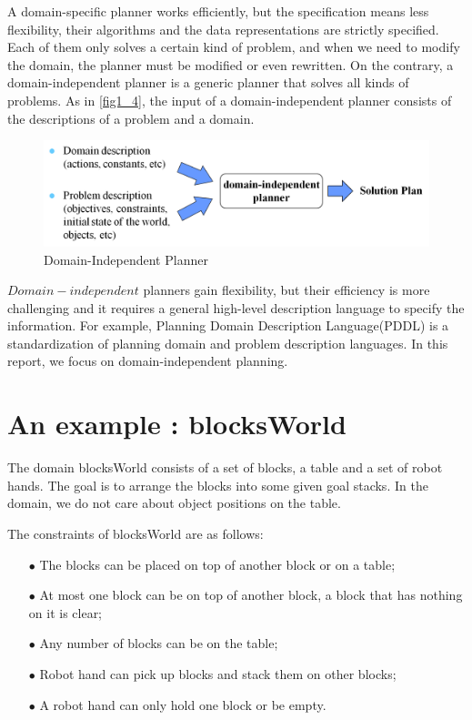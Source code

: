 A domain-specific planner works efficiently, but the specification means less flexibility, their algorithms and the data representations are strictly specified. Each of them only solves a certain kind of problem, and when we need to modify the domain, the planner must be modified or even rewritten. On the contrary, a domain-independent planner is a generic planner that solves all kinds of problems. As in \autoref{fig1_4}, the input of a domain-independent planner consists of the descriptions of a problem and a domain.

\begin{figure}[H]
    \center
    \includegraphics[width=\textwidth]{./images/1_4.png}
    \caption{Domain-Independent Planner}
    \label{fig1_4}
\end{figure}

$Domain-independent$ planners gain flexibility, but their efficiency is more challenging and it requires a general high-level description language to specify the information. For example, Planning Domain Description Language(PDDL) is a standardization of planning domain and problem description languages. In this report, we focus on domain-independent planning.

\section{An example : blocksWorld}
The domain blocksWorld consists of a set of blocks, a table and a set of robot hands. The goal is to arrange the blocks into some given goal stacks. In the domain, we do not care about object positions on the table.

The constraints of blocksWorld are as follows:
\begin{itemize}\itemsep0pt \parskip0pt 
\item[$\bullet$] The blocks can be placed on top of another block or on a table;
\item[$\bullet$] At most one block can be on top of another block, a block that has nothing on it is clear;
\item[$\bullet$] Any number of blocks can be on the table;
\item[$\bullet$] Robot hand can pick up blocks and stack them on other blocks;
\item[$\bullet$] A robot hand can only hold one block or be empty.
\end{itemize}

